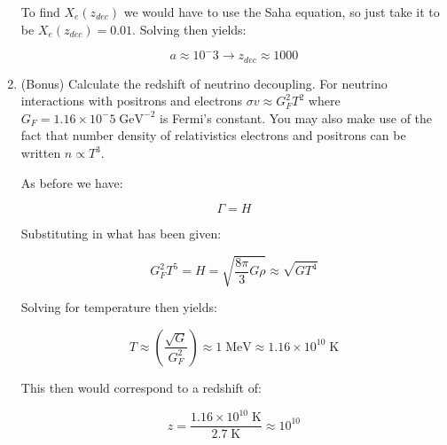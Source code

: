 \documentclass[12pt, letterpaper]{article}
\begin{document}
\begin{enumerate}
To find $X_e(z_{dec})$ we would have to use the Saha equation, so just take it to be $X_e(z_{dec}) = 0.01$. Solving then yields:

$$a \approx 10^-3 \rightarrow z_{dec} \approx 1000$$

\item (Bonus) Calculate the redshift of neutrino decoupling. For neutrino interactions with positrons and electrons $\sigma v \approx G^2_F T^2$ where $G_F = 1.16 \times 10^-5 \; \mathrm{GeV}^{-2}$ is Fermi's constant. You may also make use of the fact that number density of relativistics electrons and positrons can be written $n \propto T^3$.

As before we have:

$$\Gamma = H$$

Substituting in what has been given:

$$G^2_F T^5 = H = \sqrt{\frac{8 \pi}{3} G \rho} \approx \sqrt{G T^4}$$

Solving for temperature  then yields:

$$T \approx \left( \frac{\sqrt{G}}{G^2_F} \right) \approx 1 \; \mathrm{MeV} \approx 1.16 \times 10^{10} \; \mathrm{K}$$

This then would correspond to a redshift of:


$$z = \frac{1.16 \times 10^{10} \; \mathrm{K}}{2.7 \; \mathrm{K}} \approx 10^{10}$$


\end{enumerate}
\end{document}
